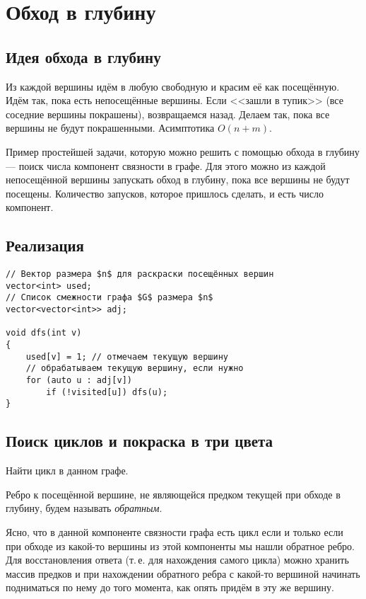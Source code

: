 \section{Обход в глубину}

\subsection{Идея обхода в глубину}

Из каждой вершины идём в любую свободную и красим её как посещённую. Идём так, пока есть непосещённые вершины. Если <<зашли в тупик>> (все соседние вершины покрашены), возвращаемся назад. Делаем так, пока все вершины не будут покрашенными. Асимптотика $O(n + m)$.

Пример простейшей задачи, которую можно решить с помощью обхода в глубину --- поиск числа компонент связности в графе. Для этого можно из каждой непосещённой вершины запускать обход в глубину, пока все вершины не будут посещены. Количество запусков, которое пришлось сделать, и есть число компонент.

\subsection{Реализация}

\begin{verbatim}
// Вектор размера $n$ для раскраски посещённых вершин
vector<int> used;
// Список смежности графа $G$ размера $n$
vector<vector<int>> adj;

void dfs(int v)
{
    used[v] = 1; // отмечаем текущую вершину
    // обрабатываем текущую вершину, если нужно
    for (auto u : adj[v])
        if (!visited[u]) dfs(u);
}
\end{verbatim}

\subsection{Поиск циклов и покраска в три цвета}

\begin{problem}
    Найти цикл в данном графе.
\end{problem}

Ребро к посещённой вершине, не являющейся предком текущей при обходе в глубину, будем называть \textit{обратным}.

Ясно, что в данной компоненте связности графа есть цикл если и только если при обходе из какой-то вершины из этой компоненты мы нашли обратное ребро. Для восстановления ответа (т.\,е. для нахождения самого цикла) можно хранить массив предков и при нахождении обратного ребра с какой-то вершиной начинать подниматься по нему до того момента, как опять придём в эту же вершину.


